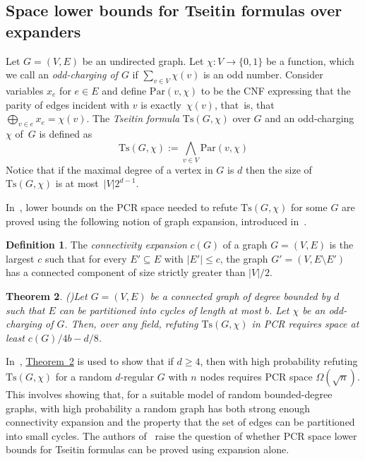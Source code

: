 \documentclass[11pt]{article}
\numberwithin{equation}{section}
\newtheorem{theorem}{Theorem}[section]
\theoremstyle{definition}
\newtheorem{definition}[theorem]{Definition}
\theoremstyle{plain}
\newcommand{\expref}[2]{\hyperref[#2]{#1~\ref{#2}}}
\newcommand\Tse{\mathrm{Ts}}
\newcommand\Par{\mathrm{Par}}
\begin{document}
\subsection{Space lower bounds for Tseitin formulas over expanders}

Let $G = (V, E)$ be an undirected graph.
Let $\chi: V \rightarrow \{0, 1\}$ be a function, which we call an \emph{odd-charging
of $G$}  if $\sum_{v\in V} \chi(v)$ is an odd number. Consider variables $x_e$ for $e\in E$ and define 
$\Par(v,\chi)$ to be the CNF 
expressing 
that the parity of edges incident with $v$ is exactly~$\chi(v)$, that~is, that ~$\bigoplus_{v \in e}x_e= \chi(v)$. 
The \emph{Tseitin formula} $\Tse(G,\chi)$ over $G$ and an odd-charging 
$\chi$ of~$G$ is defined as 
$$
\Tse(G,\chi) := \bigwedge_{v\in V} \Par(v,\chi)
$$
Notice that if the maximal degree of a vertex in $G$ is $d$ then the size of $\Tse(G,\chi)$ is at most~$|V|2^{d-1}$.

In~\cite{DBLP:conf/icalp/FilmusLMNV13}, lower bounds on the PCR space needed to refute 
$\Tse(G,\chi)$ for some $G$ are proved using the following notion of graph expansion, 
introduced in~\cite{ABRW}.


\begin{definition} 
The \emph{connectivity expansion} $c(G)$ of a graph $G = (V, E)$ is the largest $c$ such that for every $E' \subseteq E$ with $|E'|\leq c$, the graph
$G' = (V, E \setminus E')$ has a connected component of size strictly greater than $|V|/2$.
\end{definition}

\begin{theorem} \emph{(\cite{DBLP:conf/icalp/FilmusLMNV13})}\label{thm:c(G)-bound} 
Let $G = (V, E)$ be a connected graph of degree bounded by $d$  such that $E$ can be partitioned into cycles of length at
most $b$. Let $\chi$ be an odd-charging of $G$.
Then, over any field, refuting $\Tse(G, \chi)$ in PCR requires space 
at least ${c(G)}/{4b} - {d}/{8}$.
\end{theorem}


In~\cite{DBLP:conf/icalp/FilmusLMNV13}, \expref{Theorem}{thm:c(G)-bound} is used to show that if $d \ge 4$,
then with high probability refuting $\Tse(G,\chi)$ for a random $d$-regular $G$ with $n$ nodes
requires PCR space $\Omega(\sqrt{n})$. This involves showing 
that, for a suitable model of random bounded-degree graphs,
with high probability a random graph has both strong enough connectivity expansion 
and the property that the set of edges can be partitioned into small cycles.
The authors of~\cite{DBLP:conf/icalp/FilmusLMNV13} raise the question of whether 
PCR space lower bounds for Tseitin formulas can be proved using expansion alone. 
\end{document}

